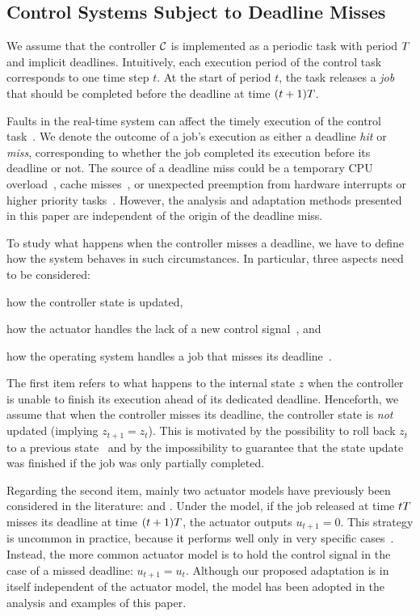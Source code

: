 \subsection{Control Systems Subject to Deadline Misses}

We assume that the controller $\mathcal{C}$ is implemented as a periodic task with period $T$ and implicit deadlines. 
Intuitively, each execution period of the control task corresponds to one time step $t$.
At the start of period $t$, the task releases a \emph{job} that should be completed before the deadline at time $(t+1) T$.

Faults in the real-time system can affect the timely execution of the control task~\cite{Steinbauer:2013}.
We denote the outcome of a job's execution as either a deadline \emph{hit} or \emph{miss}, corresponding to whether the job completed its execution before its deadline or not. 
The source of a deadline miss could be a temporary CPU overload~\cite{Baruah:1997}, cache misses~\cite{Milligan:1996, Wang:2012},  or unexpected preemption from hardware interrupts or higher priority tasks~\cite{Stankovic:1995}.
However, the analysis and adaptation methods presented in this paper are independent of the origin of the deadline miss.

To study what happens when the controller misses a deadline, we have to define how the system behaves in such circumstances.
In particular, three aspects need to be considered: 
\begin{enumerate*}[label=(\roman*)]
    \item how the controller state is updated, 
    \item how the actuator handles the lack of a new control signal~\cite{Schenato:2009}, and
    \item how the operating system handles a job that misses its deadline~\cite{Pazzaglia:2019, Cervin:2005}.
\end{enumerate*}
The first item refers to what happens to the internal state $z$ when the controller is unable to finish its execution ahead of its dedicated deadline.
Henceforth, we assume that when the controller misses its deadline, the controller state is \emph{not} updated (implying $z_{t+1} = z_t$). 
This is motivated by the possibility to roll back $z_t$ to a previous state~\cite{akesson:2020, Seong:2001, Zhang:2003} and by the impossibility to guarantee that the state update was finished if the job was only partially completed.

Regarding the second item, mainly two actuator models have previously been considered in the literature: \emph{\tZ{}} and \emph{\tH{}} \cite{Schenato:2009}.
Under the \tZ{} model, if the job released at time $tT$ misses its deadline at time  $(t+1)T$, the actuator outputs $u_{t+1} = 0$.
This strategy is uncommon in practice, because it performs well only in very specific cases~\cite{Vreman:2021ecrts}. 
Instead, the more common actuator model is to hold the control signal in the case of a missed deadline: $u_{t+1} = u_t$.
Although our proposed adaptation is in itself independent of the actuator model, the \tH{} model has been adopted in the analysis and examples of this paper.

